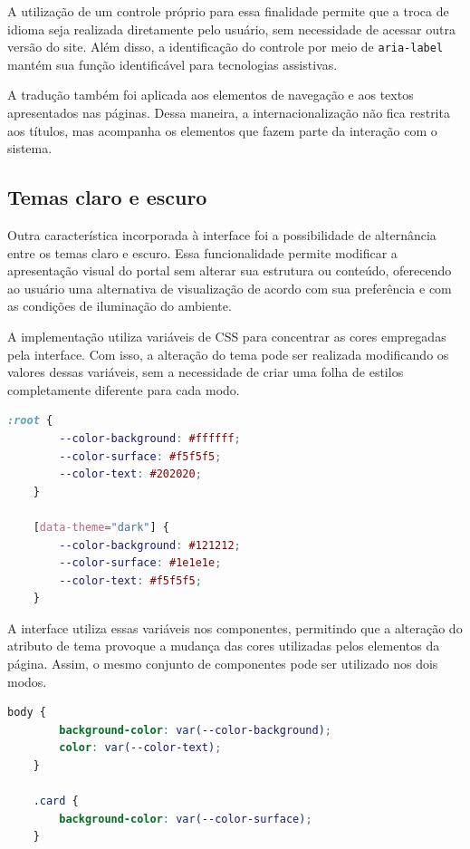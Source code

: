 A utilização de um controle próprio para essa finalidade permite que a troca de idioma seja realizada diretamente pelo usuário, sem necessidade de acessar outra versão do site. Além disso, a identificação do controle por meio de \texttt{aria-label} mantém sua função identificável para tecnologias assistivas.

A tradução também foi aplicada aos elementos de navegação e aos textos apresentados nas páginas. Dessa maneira, a internacionalização não fica restrita aos títulos, mas acompanha os elementos que fazem parte da interação com o sistema.

\vspace{5mm}
\subsection{Temas claro e escuro}

Outra característica incorporada à interface foi a possibilidade de alternância entre os temas claro e escuro. Essa funcionalidade permite modificar a apresentação visual do portal sem alterar sua estrutura ou conteúdo, oferecendo ao usuário uma alternativa de visualização de acordo com sua preferência e com as condições de iluminação do ambiente.

A implementação utiliza variáveis de CSS para concentrar as cores empregadas pela interface. Com isso, a alteração do tema pode ser realizada modificando os valores dessas variáveis, sem a necessidade de criar uma folha de estilos completamente diferente para cada modo.

\begin{lstlisting}[language=CSS, caption={Utilização de variáveis para os temas da interface.}, label={lst:themes}]
	:root {
		--color-background: #ffffff;
		--color-surface: #f5f5f5;
		--color-text: #202020;
	}
	
	[data-theme="dark"] {
		--color-background: #121212;
		--color-surface: #1e1e1e;
		--color-text: #f5f5f5;
	}
\end{lstlisting}

A interface utiliza essas variáveis nos componentes, permitindo que a alteração do atributo de tema provoque a mudança das cores utilizadas pelos elementos da página. Assim, o mesmo conjunto de componentes pode ser utilizado nos dois modos.

\begin{lstlisting}[language=CSS, caption={Aplicação das variáveis de tema aos elementos da interface.}, label={lst:themeuse}]
	body {
		background-color: var(--color-background);
		color: var(--color-text);
	}
	
	.card {
		background-color: var(--color-surface);
	}
\end{lstlisting}

